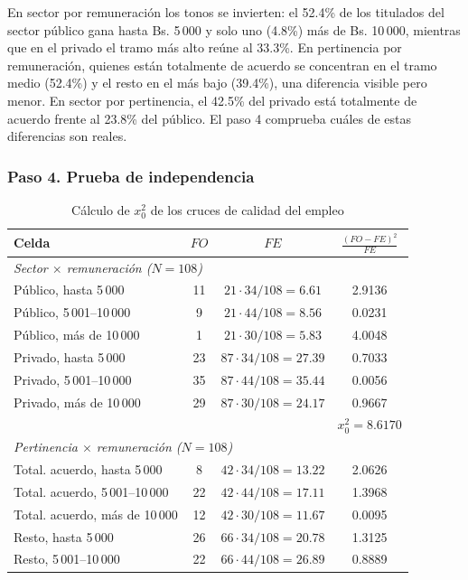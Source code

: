 \documentclass[12pt, a4paper]{article}
\newenvironment{mitabla}[2][H]{%
  \begin{table}[#1]
  \centering
  \caption{#2}
  \small
}{%
  \end{table}
}
\begin{document}
En sector por remuneración los tonos se invierten: el 52.4\% de los
titulados del sector público gana hasta Bs. 5\,000 y solo uno (4.8\%)
más de Bs. 10\,000, mientras que en el privado el tramo más alto reúne al
33.3\%. En pertinencia por remuneración, quienes están totalmente de
acuerdo se concentran en el tramo medio (52.4\%) y el resto en el más
bajo (39.4\%), una diferencia visible pero menor. En sector por
pertinencia, el 42.5\% del privado está totalmente de acuerdo frente al
23.8\% del público. El paso 4 comprueba cuáles de estas diferencias son
reales.

\subsubsection{Paso 4. Prueba de independencia}

\begin{mitabla}{Cálculo de $x_0^2$ de los cruces de calidad del empleo}\label{tab:a3-chi}
\begin{tabular}{lccc}
\toprule
\textbf{Celda} & \textbf{$FO$} & \textbf{$FE$} & \textbf{$\frac{(FO-FE)^2}{FE}$} \\
\midrule
\multicolumn{4}{l}{\textit{Sector $\times$ remuneración ($N = 108$)}} \\
Público, hasta 5\,000 & 11 & $21 \cdot 34/108 = 6.61$ & 2.9136 \\
Público, 5\,001--10\,000 & 9 & $21 \cdot 44/108 = 8.56$ & 0.0231 \\
Público, más de 10\,000 & 1 & $21 \cdot 30/108 = 5.83$ & 4.0048 \\
Privado, hasta 5\,000 & 23 & $87 \cdot 34/108 = 27.39$ & 0.7033 \\
Privado, 5\,001--10\,000 & 35 & $87 \cdot 44/108 = 35.44$ & 0.0056 \\
Privado, más de 10\,000 & 29 & $87 \cdot 30/108 = 24.17$ & 0.9667 \\
 & & & $x_0^2 = 8.6170$ \\
\midrule
\multicolumn{4}{l}{\textit{Pertinencia $\times$ remuneración ($N = 108$)}} \\
Total. acuerdo, hasta 5\,000 & 8 & $42 \cdot 34/108 = 13.22$ & 2.0626 \\
Total. acuerdo, 5\,001--10\,000 & 22 & $42 \cdot 44/108 = 17.11$ & 1.3968 \\
Total. acuerdo, más de 10\,000 & 12 & $42 \cdot 30/108 = 11.67$ & 0.0095 \\
Resto, hasta 5\,000 & 26 & $66 \cdot 34/108 = 20.78$ & 1.3125 \\
Resto, 5\,001--10\,000 & 22 & $66 \cdot 44/108 = 26.89$ & 0.8889 \\

\end{tabular}
\end{mitabla}
\end{document}
